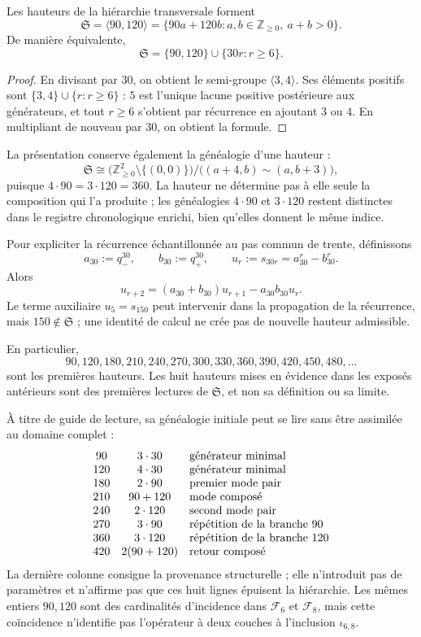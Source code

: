 \begin{theorem}
\label{thm:semigrupo-alturas-rev7} Les hauteurs de la hiérarchie transversale forment
\[
 \mathfrak S
 =\langle90,120\rangle
 =\{90a+120b:a,b\in\mathbb Z_{\ge0},\ a+b>0\}.
\]
De manière équivalente,
\[
 \boxed{\mathfrak S=\{90,120\}\cup\{30r:r\ge6\}.}
\]
\end{theorem}

\begin{proof}
En divisant par \(30\), on obtient le semi-groupe \(\langle3,4\rangle\). Ses éléments positifs sont \(\{3,4\}\cup\{r:r\ge6\}\) : \(5\) est l'unique lacune positive postérieure aux générateurs, et tout \(r\ge6\) s'obtient par récurrence en ajoutant \(3\) ou \(4\). En multipliant de nouveau par \(30\), on obtient la formule.
\end{proof}

La présentation conserve également la généalogie d'une hauteur :
\[
 \mathfrak S\cong
 \bigl(\mathbb Z_{\ge0}^2\setminus\{(0,0)\}\bigr)
 \big/\bigl((a+4,b)\sim(a,b+3)\bigr),
\]
puisque \(4\cdot90=3\cdot120=360\). La hauteur ne détermine pas à elle seule la composition qui l'a produite ; les généalogies \(4\cdot90\) et \(3\cdot120\) restent distinctes dans le registre chronologique enrichi, bien qu'elles donnent le même indice.

Pour expliciter la récurrence échantillonnée au pas commun de trente, définissons
\[
 a_{30}:=q_-^{30},\qquad b_{30}:=q_+^{30},\qquad
 u_r:=s_{30r}=a_{30}^r-b_{30}^r.
\]
Alors
\[
 \boxed{u_{r+2}=(a_{30}+b_{30})u_{r+1}-a_{30}b_{30}u_r.}
\]
Le terme auxiliaire \(u_5=s_{150}\) peut intervenir dans la propagation de la récurrence, mais \(150\notin\mathfrak S\) ; une identité de calcul ne crée pas de nouvelle hauteur admissible.

En particulier,
\[
90,120,180,210,240,270,300,330,360,390,420,450,480,\ldots
\]
sont les premières hauteurs. Les huit hauteurs mises en évidence dans les exposés antérieurs sont des premières lectures de \(\mathfrak S\), et non sa définition ou sa limite.

À titre de guide de lecture, sa généalogie initiale peut se lire sans être assimilée au domaine complet :
\[
\begin{array}{c@{\quad}c@{\quad}l}
90&3\cdot30&\text{générateur minimal}\\
120&4\cdot30&\text{générateur minimal}\\
180&2\cdot90&\text{premier mode pair}\\
210&90+120&\text{mode composé}\\
240&2\cdot120&\text{second mode pair}\\
270&3\cdot90&\text{répétition de la branche 90}\\
360&3\cdot120&\text{répétition de la branche 120}\\
420&2(90+120)&\text{retour composé}
\end{array}
\]
La dernière colonne consigne la provenance structurelle ; elle n'introduit pas de paramètres et n'affirme pas que ces huit lignes épuisent la hiérarchie. Les mêmes entiers \(90,120\) sont des cardinalités d'incidence dans \(\mathcal F_6\) et \(\mathcal F_8\), mais cette coïncidence n'identifie pas l'opérateur à deux couches à l'inclusion \(\iota_{6,8}\).


